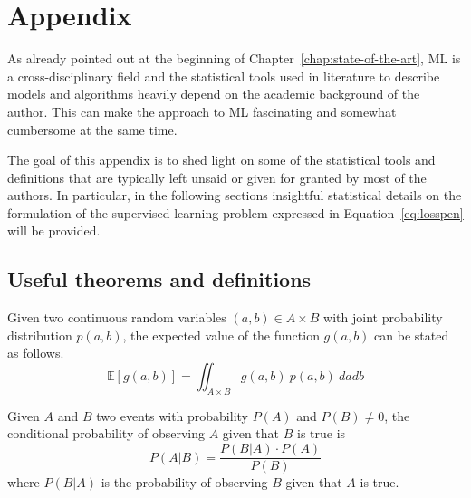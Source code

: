 \appendix

\chapter{Appendix} \label{appendix:A}
As already pointed out at the beginning of Chapter~\ref{chap:state-of-the-art}, ML is a cross-disciplinary field and the statistical tools used in literature to describe models and algorithms heavily depend on the academic background of the author. This can make the approach to ML fascinating and somewhat cumbersome at the same time.

The goal of this appendix is to shed light on some of the statistical tools and definitions that are typically left unsaid or given for granted by most of the authors. In particular, in the following sections insightful statistical details on the formulation of the supervised learning problem expressed in Equation~\eqref{eq:losspen} will be provided.


\section{Useful theorems and definitions}

\begin{theorem} \label{th:lotus}
	Given two continuous random variables $(a,b) \in A \times B$ with joint probability distribution $p(a,b)$, the expected value of the function $g(a,b)$ can be stated as follows.
	$$\mathbb{E}[g(a,b)]=\iint_{A \times B}g(a,b)~p(a,b)~dadb$$
\end{theorem}

\begin{theorem} \label{th:bayes_rule}
	Given $A$ and $B$ two events with probability $P(A)$ and $P(B) \neq 0$, the conditional probability of observing $A$ given that $B$ is true is
	$$P(A|B) = \frac{P(B|A) \cdot P(A)}{P(B)}$$
	where $P(B|A)$ is the probability of observing $B$ given that $A$ is true.
\end{theorem}


